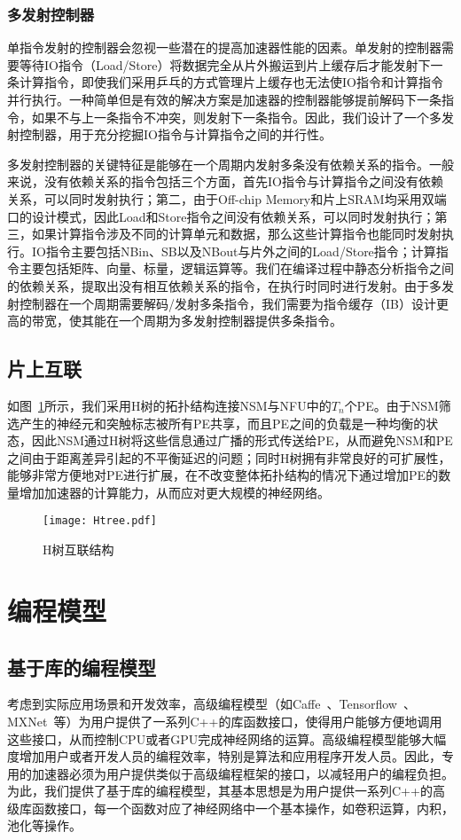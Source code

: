 \subsubsection{多发射控制器}
单指令发射的控制器会忽视一些潜在的提高加速器性能的因素。单发射的控制器需要等待IO指令（Load/Store）将数据完全从片外搬运到片上缓存后才能发射下一条计算指令，即使我们采用乒乓的方式管理片上缓存也无法使IO指令和计算指令并行执行。一种简单但是有效的解决方案是加速器的控制器能够提前解码下一条指令，如果不与上一条指令不冲突，则发射下一条指令。因此，我们设计了一个多发射控制器，用于充分挖掘IO指令与计算指令之间的并行性。

多发射控制器的关键特征是能够在一个周期内发射多条没有依赖关系的指令。一般来说，没有依赖关系的指令包括三个方面，首先IO指令与计算指令之间没有依赖关系，可以同时发射执行；第二，由于Off-chip Memory和片上SRAM均采用双端口的设计模式，因此Load和Store指令之间没有依赖关系，可以同时发射执行；第三，如果计算指令涉及不同的计算单元和数据，那么这些计算指令也能同时发射执行。IO指令主要包括NBin、SB以及NBout与片外之间的Load/Store指令；计算指令主要包括矩阵、向量、标量，逻辑运算等。我们在编译过程中静态分析指令之间的依赖关系，提取出没有相互依赖关系的指令，在执行时同时进行发射。由于多发射控制器在一个周期需要解码/发射多条指令，我们需要为指令缓存（IB）设计更高的带宽，使其能在一个周期为多发射控制器提供多条指令。

\subsection{片上互联}


如图~\ref{fig:Htree}所示，我们采用H树的拓扑结构连接NSM与NFU中的$T_n$个PE。由于NSM筛选产生的神经元和突触标志被所有PE共享，而且PE之间的负载是一种均衡的状态，因此NSM通过H树将这些信息通过广播的形式传送给PE，从而避免NSM和PE之间由于距离差异引起的不平衡延迟的问题；同时H树拥有非常良好的可扩展性，能够非常方便地对PE进行扩展，在不改变整体拓扑结构的情况下通过增加PE的数量增加加速器的计算能力，从而应对更大规模的神经网络。

\begin{figure}[h]
\centering
\texttt{[image: Htree.pdf]}
\caption{H树互联结构}
\label{fig:Htree}
\end{figure}

\section{编程模型}

\subsection{基于库的编程模型}
考虑到实际应用场景和开发效率，高级编程模型（如Caffe~\cite{jia2014caffe}、Tensorflow~\cite{abadi2016tensorflow}、MXNet~\cite{chen2015mxnet}等）为用户提供了一系列C++的库函数接口，使得用户能够方便地调用这些接口，从而控制CPU或者GPU完成神经网络的运算。高级编程模型能够大幅度增加用户或者开发人员的编程效率，特别是算法和应用程序开发人员。因此，专用的加速器必须为用户提供类似于高级编程框架的接口，以减轻用户的编程负担。为此，我们提供了基于库的编程模型，其基本思想是为用户提供一系列C++的高级库函数接口，每一个函数对应了神经网络中一个基本操作，如卷积运算，内积，池化等操作。

